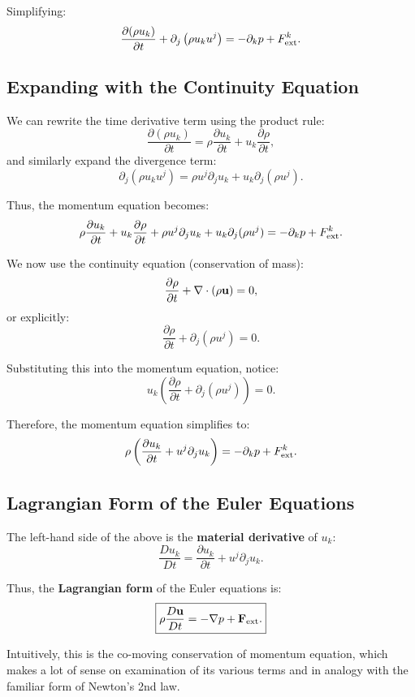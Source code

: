 Simplifying:
\[
\frac{\partial (\rho u_k)}{\partial t} + \partial_j \left( \rho u_k u^j \right) = - \partial_k p + F^k_{\rm ext}.
\]

\subsection*{Expanding with the Continuity Equation}

We can rewrite the time derivative term using the product rule:
\[
\frac{\partial (\rho u_k)}{\partial t} = \rho \frac{\partial u_k}{\partial t} + u_k \frac{\partial \rho}{\partial t},
\]
and similarly expand the divergence term:
\[
\partial_j \left( \rho u_k u^j \right) = \rho u^j \partial_j u_k + u_k \partial_j ( \rho u^j ).
\]

Thus, the momentum equation becomes:
\[
\rho \frac{\partial u_k}{\partial t} + u_k \frac{\partial \rho}{\partial t} + \rho u^j \partial_j u_k + u_k \partial_j ( \rho u^j ) = - \partial_k p + F^k_{\rm ext}.
\]

We now use the continuity equation (conservation of mass):
\[
\frac{\partial \rho}{\partial t} + \nabla \cdot ( \rho {\bf u} ) = 0,
\]
or explicitly:
\[
\frac{\partial \rho}{\partial t} + \partial_j ( \rho u^j ) = 0.
\]

Substituting this into the momentum equation, notice:
\[
u_k \left( \frac{\partial \rho}{\partial t} + \partial_j ( \rho u^j ) \right) = 0.
\]

Therefore, the momentum equation simplifies to:
\[
\rho \left( \frac{\partial u_k}{\partial t} + u^j \partial_j u_k \right) = - \partial_k p + F^k_{\rm ext}.
\]

\subsection*{Lagrangian Form of the Euler Equations}

The left-hand side of the above is the \textbf{material derivative} of $u_k$:
\[
\frac{D u_k}{D t} = \frac{\partial u_k}{\partial t} + u^j \partial_j u_k.
\]

Thus, the \textbf{Lagrangian form} of the Euler equations is:
\begin{equation}
\label{eq:momentum_lagrangian}
\boxed{
\rho \frac{D {\bf u}}{D t} = - \nabla p + {\bf F}_{\rm ext}.
}
\end{equation}

Intuitively, this is the co-moving conservation of momentum equation, which makes a lot of sense on examination of its various terms and in analogy with the familiar form of Newton's 2nd law.

